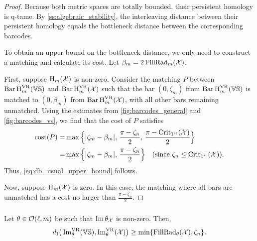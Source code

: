 \begin{proof}
    Because both metric spaces are totally bounded, their persistent homology is q-tame.
    By \cref{ss:algebraic_stability}, the interleaving distance between their persistent homology equals the bottleneck distance between the corresponding barcodes.

    To obtain an upper bound on the bottleneck distance, we only need to construct a matching and calculate its cost. Let \( \beta_m = 2\firstdeath{m}{\cX} \).

    First, suppose \( \opH_m(\cX) \) is non-zero.
    Consider the matching \( P \) between \( \Hbarc[\field]{m}{\VS} \) and \( \Hbarc[\field]{m}{\cX} \) such that the bar \( (0, \zeta_m) \) from \( \Hbarc[\field]{m}{\VS} \) is matched to \( (0, \beta_m) \) from \( \Hbarc[\field]{m}{\cX} \), with all other bars remaining unmatched. Using the estimates from \cref{fig:barcodes_general} and \cref{fig:barcodes_vs}, we find that the cost of \( P \) satisfies
    \begin{align*}
        \cost(P)
        = & \max\Big\{|\zeta_m - \beta_m|,\, \frac{\pi - \zeta_n}{2},\, \frac{\pi - \crit(\cX)}{2}\Big\} \\
        = & \max\Big\{|\zeta_m - \beta_m|,\, \frac{\pi - \zeta_n}{2}\Big\} \quad \text{(since \( \zeta_n \leq \crit(\cX) \))}.
    \end{align*}
    Thus, \cref{eq:db_usual_upper_bound} follows.

    Now, suppose \( \opH_m(\cX) \) is zero. In this case, the matching where all bars are unmatched has a cost no larger than \( \frac{\pi - \zeta_n}{2}\).
\end{proof}

\subsubsection{}\label{sss:db_theta_lower_bound}

\medskip\lemma
Let $\theta \in \cO(\ell, m)$ be such that $\img \theta_\cX$ is non-zero.
Then,
\begin{equation}\label{eq:db_theta_lower_bound}
	\di\big(\img^{\VR}_{\theta}(\VS), \img^{\VR}_{\theta}(\cX)\big)
	\geq \min\{\firstdeath{\theta}{\cX}, \zeta_n\}. %
\end{equation}

